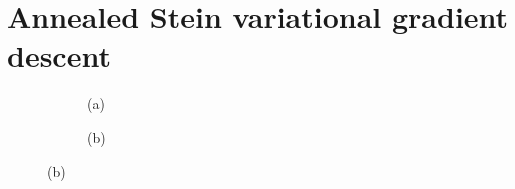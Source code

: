 \section{Annealed Stein variational gradient descent}\label{sec:asvgd} 




\captionsetup[subfigure]{labelformat=empty}
\begin{figure}[t!]
    \centering 
\begin{subfigure}[b]{.48\textwidth} 
    \caption{(a)\label{fig:bw1}}
\end{subfigure}
\hfill
\centering
\begin{subfigure}[b]{0.48\textwidth}
    \caption{(b)\label{fig:bw5}}
\end{subfigure}

\end{figure}
